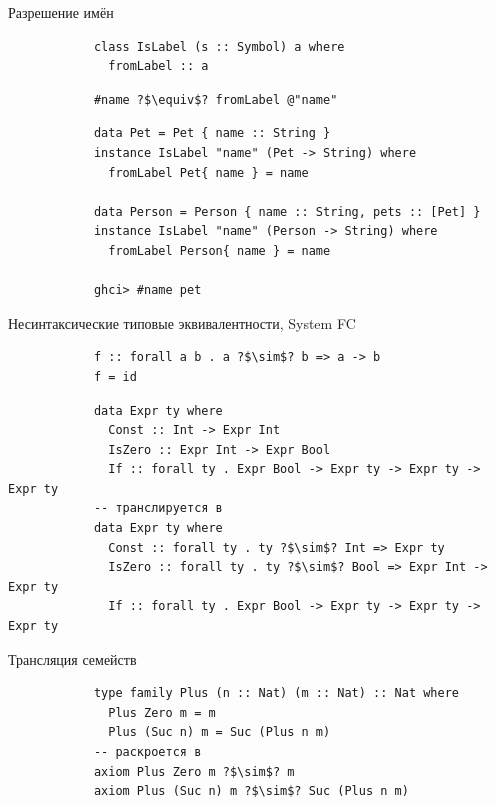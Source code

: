     \begin{frame}[fragile]{Разрешение имён}
        \pause
        \begin{verbatim}
            class IsLabel (s :: Symbol) a where
              fromLabel :: a
        \end{verbatim}
        \pause\vspace{1em}
        \begin{verbatim}
            #name ?$\equiv$? fromLabel @"name"
        \end{verbatim}
        \pause\vspace{1em}
        \begin{verbatim}
            data Pet = Pet { name :: String }
            instance IsLabel "name" (Pet -> String) where
              fromLabel Pet{ name } = name

            data Person = Person { name :: String, pets :: [Pet] }
            instance IsLabel "name" (Person -> String) where
              fromLabel Person{ name } = name

            ghci> #name pet
        \end{verbatim}
    \end{frame}

    \begin{frame}[fragile]{Несинтаксические типовые эквивалентности, System FC}
        \pause
        \begin{verbatim}
            f :: forall a b . a ?$\sim$? b => a -> b
            f = id
        \end{verbatim}
        \pause\vspace{1em}
        \begin{verbatim}
            data Expr ty where
              Const :: Int -> Expr Int
              IsZero :: Expr Int -> Expr Bool
              If :: forall ty . Expr Bool -> Expr ty -> Expr ty -> Expr ty
            -- транслируется в
            data Expr ty where
              Const :: forall ty . ty ?$\sim$? Int => Expr ty
              IsZero :: forall ty . ty ?$\sim$? Bool => Expr Int -> Expr ty
              If :: forall ty . Expr Bool -> Expr ty -> Expr ty -> Expr ty
        \end{verbatim}
    \end{frame}

    \begin{frame}[fragile]{Трансляция семейств}
        \pause
        \begin{verbatim}
            type family Plus (n :: Nat) (m :: Nat) :: Nat where
              Plus Zero m = m
              Plus (Suc n) m = Suc (Plus n m)
            -- раскроется в
            axiom Plus Zero m ?$\sim$? m
            axiom Plus (Suc n) m ?$\sim$? Suc (Plus n m)
        \end{verbatim}
    \end{frame}

